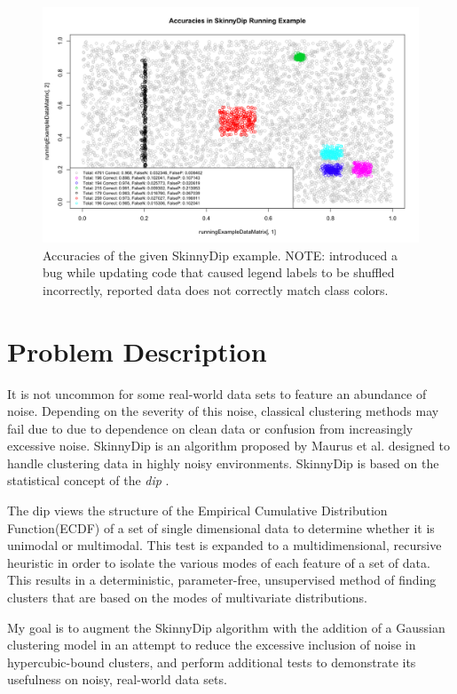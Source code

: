\documentclass{sig-alternate-05-2015}
\begin{document}
\begin{figure}[t]
\centering
\includegraphics[width=\textwidth]{images/SkinnyDipAccuracy}
\caption{Accuracies of the given SkinnyDip example. NOTE: introduced a bug while updating code that caused legend labels to be shuffled incorrectly, reported data does not correctly match class colors.}
\label{fig:sdaccuracy}
\end{figure}

\section{Problem Description}
It is not uncommon for some real-world data sets to feature an abundance of noise. Depending on the severity of this noise, classical clustering methods may fail due to due to dependence on clean data or confusion from increasingly excessive noise. SkinnyDip is an algorithm proposed by Maurus et al.\cite{skinnydip} designed to handle clustering data in highly noisy environments. SkinnyDip is based on the statistical concept of the \textit{dip} \cite{dip}. 

The dip views the structure of the Empirical Cumulative Distribution Function(ECDF) of a set of single dimensional data to determine whether it is unimodal or multimodal. This test is expanded to a multidimensional, recursive heuristic in order to isolate the various modes of each feature of a set of data. This results in a deterministic, parameter-free, unsupervised method of finding clusters that are based on the modes of multivariate distributions. 

My goal is to augment the SkinnyDip algorithm with the addition of a Gaussian clustering model in an attempt to reduce the excessive inclusion of noise in hypercubic-bound clusters, and perform additional tests to demonstrate its usefulness on noisy, real-world data sets.
\end{document}
